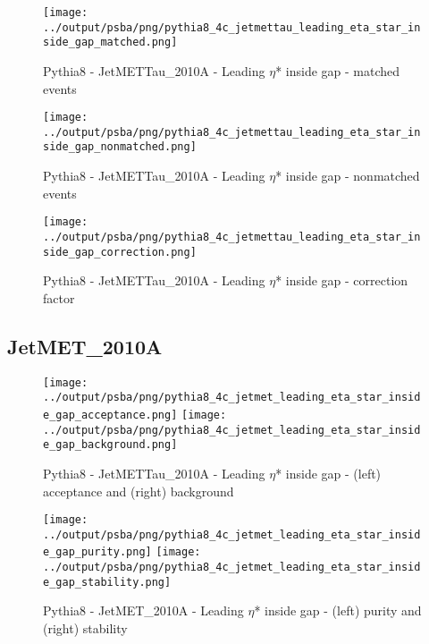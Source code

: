 \documentclass[11pt]{book}
\begin{document}
\begin{figure}[ht]
\centering
\texttt{[image: ../output/psba/png/pythia8\_4c\_jetmettau\_leading\_eta\_star\_inside\_gap\_matched.png]}
\caption{Pythia8 - JetMETTau\_2010A - Leading $\eta$* inside gap - matched events}
\label{fig:p8_jetmettau_leading_eta_star_inside_gap_matched}
\end{figure}

\begin{figure}[ht]
\centering
\texttt{[image: ../output/psba/png/pythia8\_4c\_jetmettau\_leading\_eta\_star\_inside\_gap\_nonmatched.png]}
\caption{Pythia8 - JetMETTau\_2010A - Leading $\eta$* inside gap - nonmatched events}
\label{fig:p8_jetmettau_leading_eta_star_inside_gap_nonmatched}
\end{figure}

\begin{figure}[ht]
\centering
\texttt{[image: ../output/psba/png/pythia8\_4c\_jetmettau\_leading\_eta\_star\_inside\_gap\_correction.png]}
\caption{Pythia8 - JetMETTau\_2010A - Leading $\eta$* inside gap - correction factor}
\label{fig:p8_jetmettau_leading_eta_star_inside_gap_correction}
\end{figure}


\clearpage
\subsection{JetMET\_2010A}

\begin{figure}[ht]
\centering
\texttt{[image: ../output/psba/png/pythia8\_4c\_jetmet\_leading\_eta\_star\_inside\_gap\_acceptance.png]}
\texttt{[image: ../output/psba/png/pythia8\_4c\_jetmet\_leading\_eta\_star\_inside\_gap\_background.png]}
\caption{Pythia8 - JetMETTau\_2010A - Leading $\eta$* inside gap - (left) acceptance and (right) background}
\label{fig:p8_jetmettau_leading_eta_star_inside_gap_ab}
\end{figure}

\begin{figure}[ht]
\centering
\texttt{[image: ../output/psba/png/pythia8\_4c\_jetmet\_leading\_eta\_star\_inside\_gap\_purity.png]}
\texttt{[image: ../output/psba/png/pythia8\_4c\_jetmet\_leading\_eta\_star\_inside\_gap\_stability.png]}
\caption{Pythia8 - JetMET\_2010A - Leading $\eta$* inside gap - (left) purity and (right) stability}
\label{fig:p8_jetmet_leading_eta_star_inside_gap_ps}
\end{figure}
\end{document}
